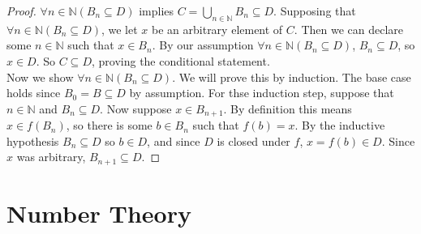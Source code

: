 \documentclass{report}
\theoremstyle{definition}
\begin{document}
\begin{proof}
$\forall n\in\mathbb N(B_n\subseteq D)$ implies $C=\bigcup_{n\in\mathbb N}B_n\subseteq D$. 
Supposing that $\forall n\in\mathbb N(B_n\subseteq D)$, we let $x$ be an arbitrary element of $C$.
Then we can declare some $n\in\mathbb N$ such that $x\in B_n$. By our assumption 
$\forall n\in\mathbb N(B_n\subseteq D)$, $B_n\subseteq D$, so $x\in D$. So $C\subseteq D$, proving the conditional statement.\\
\indent Now we show $\forall n\in\mathbb N(B_n\subseteq D)$. We will prove this by induction. The base case holds since $B_0=B\subseteq D$ by assumption. For thse induction step,
suppose that $n\in\mathbb N$ and $B_n\subseteq D$. Now suppose $x\in B_{n+1}$. By definition
this means $x\in f(B_n)$, so there is some $b\in B_n$ such that $f(b)=x$. By the inductive hypothesis $B_n\subseteq D$ so $b\in D$, and since $D$ is closed under $f$, $x=f(b)\in D$. 
Since $x$ was arbitrary, $B_{n+1}\subseteq D$.
\end{proof}
\newpage

\chapter{Number Theory}
\end{document}
